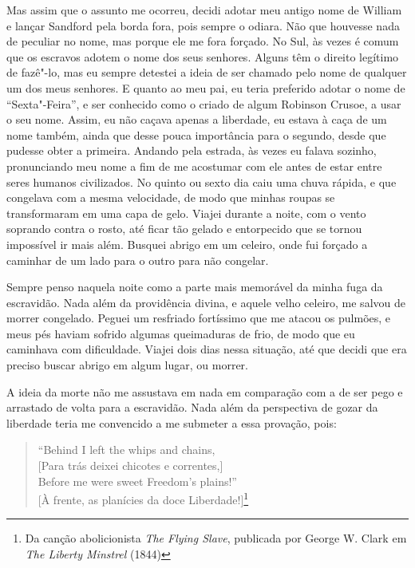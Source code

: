 Mas assim que o assunto me ocorreu, decidi adotar meu antigo nome de
William e lançar Sandford pela borda fora, pois sempre o odiara. Não que
houvesse nada de peculiar no nome, mas porque ele me fora forçado. No
Sul, às vezes é comum que os escravos adotem o nome dos seus senhores.
Alguns têm o direito legítimo de fazê"-lo, mas eu sempre detestei a ideia
de ser chamado pelo nome de qualquer um dos meus senhores. E quanto ao
meu pai, eu teria preferido adotar o nome de ``Sexta"-Feira'', e ser
conhecido como o criado de algum Robinson Crusoe, a usar o seu nome.
Assim, eu não caçava apenas a liberdade, eu estava à caça de um nome
também, ainda que desse pouca importância para o segundo, desde que
pudesse obter a primeira. Andando pela estrada, às vezes eu falava
sozinho, pronunciando meu nome a fim de me acostumar com ele antes de
estar entre seres humanos civilizados. No quinto ou sexto dia caiu uma
chuva rápida, e que congelava com a mesma velocidade, de modo que minhas
roupas se transformaram em uma capa de gelo. Viajei durante a noite, com
o vento soprando contra o rosto, até ficar tão gelado e entorpecido que
se tornou impossível ir mais além. Busquei abrigo em um celeiro, onde
fui forçado a caminhar de um lado para o outro para não congelar.

Sempre penso naquela noite como a parte mais memorável da minha fuga da
escravidão. Nada além da providência divina, e aquele velho celeiro, me
salvou de morrer congelado. Peguei um resfriado fortíssimo que me atacou
os pulmões, e meus pés haviam sofrido algumas queimaduras de frio, de
modo que eu caminhava com dificuldade. Viajei dois dias nessa situação,
até que decidi que era preciso buscar abrigo em algum lugar, ou morrer.

A ideia da morte não me assustava em nada em comparação com a de ser
pego e arrastado de volta para a escravidão. Nada além da perspectiva de
gozar da liberdade teria me convencido a me submeter a essa provação,
pois:

\begin{verse}
``Behind I left the whips and chains,\\
{[}Para trás deixei chicotes e correntes,{]}\\
Before me were sweet Freedom's plains!''\\
{[}À frente, as planícies da
doce Liberdade!{]}\footnote{Da canção abolicionista \emph{The Flying
  Slave}, publicada por George W. Clark em \emph{The Liberty Minstrel}
  (1844)}
\end{verse}

